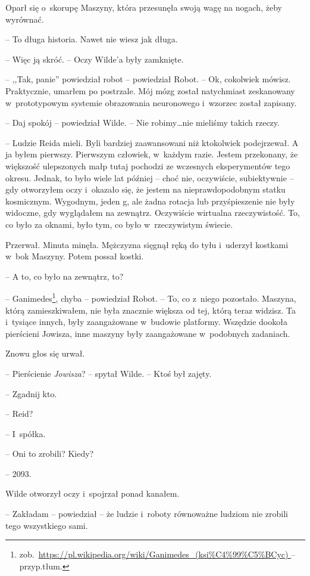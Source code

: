 \documentclass[oneside,polish,11pt,sfheadings]{mwbk}
\begin{document}
Oparł się o~skorupę Maszyny, która przesunęła swoją wagę na nogach, żeby
wyrównać.

-- To długa historia. Nawet nie wiesz jak długa.

-- Więc ją skróć. -- Oczy Wilde'a były zamknięte.

-- ,,Tak, panie'' powiedział robot -- powiedział Robot. -- Ok, cokolwiek
mówisz. Praktycznie, umarłem po postrzale. Mój mózg został natychmiast
zeskanowany w~prototypowym systemie obrazowania neuronowego i~wzorzec
został zapisany.

-- Daj spokój -- powiedział Wilde. -- Nie robimy\ldots nie mieliśmy takich
rzeczy.

-- Ludzie Reida mieli. Byli bardziej zaawansowani niż ktokolwiek
podejrzewał. A ja byłem pierwszy. Pierwszym człowiek, w~każdym razie.
Jestem przekonany, że większość ulepszonych małp tutaj pochodzi ze
wczesnych eksperymentów tego okresu. Jednak, to było wiele lat później -- choć nie, oczywiście, subiektywnie -- gdy otworzyłem oczy i~okazało się,
że jestem na nieprawdopodobnym statku kosmicznym. Wygodnym, jeden g, ale
żadna rotacja lub przyśpieszenie nie były widoczne, gdy wyglądałem na
zewnątrz. Oczywiście wirtualna rzeczywistość. To, co było za oknami,
było tym, co było w~rzeczywistym świecie.

Przerwał. Minuta minęła. Mężczyzna sięgnął ręką do tyłu i~uderzył
kostkami w~bok Maszyny. Potem possał kostki.

-- A to, co było na zewnątrz, to?

-- Ganimedes\footnote{
zob.~\url{https://pl.wikipedia.org/wiki/Ganimedes_(ksi\%C4\%99\%C5\%BCyc) } -- przyp.tłum.}, chyba -- powiedział Robot.  -- To, co z~niego pozostało. Maszyna, którą zamieszkiwałem,
nie była znacznie większa od tej, którą teraz widzisz. Ta i~tysiące
innych, były zaangażowane w~budowie platformy. Wszędzie dookoła
pierścieni Jowisza, inne maszyny były zaangażowane w~podobnych zadaniach.

Znowu głos się urwał.

-- Pierścienie \emph{Jowisza}? -- spytał Wilde. -- Ktoś był zajęty.

-- Zgadnij kto.

-- Reid?

-- I~spółka.

-- Oni to zrobili? Kiedy?

-- 2093.

Wilde otworzył oczy i~spojrzał ponad kanałem.

-- Zakładam -- powiedział -- że ludzie i~roboty równoważne ludziom nie
zrobili tego wszystkiego sami.
\end{document}
